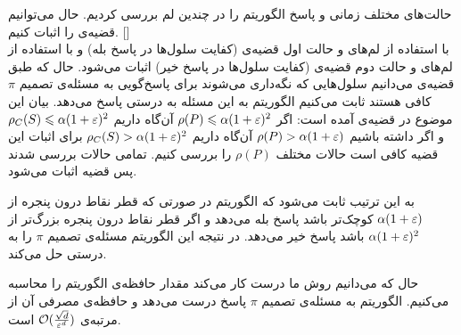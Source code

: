 حالت‌های مختلف زمانی و پاسخ الگوریتم را در چندین لم بررسی کردیم. حال می‌توانیم قضیه‌ی   را اثبات کنیم.
[]\\
با استفاده از لم‌های  و  حالت اول قضیه‌ی  (کفایت سلول‌ها در پاسخ بله) و با استفاده از لم‌های  و  حالت دوم قضیه‌ی  (کفایت سلول‌ها در پاسخ خیر) اثبات می‌شود. 
حال که طبق قضیه‌ی  می‌دانیم سلول‌هایی که نگه‌داری می‌شوند برای پاسخ‌گویی به مسئله‌ی تصمیم $\pi$ کافی هستند ثابت می‌کنیم الگوریتم  به این مسئله  به درستی پاسخ می‌دهد. بیان این موضوع در قضیه‌ی  آمده است:
اگر 
$ \rho(P) \leqslant \alpha (1 + \varepsilon) ^ 2 $
‌آن‌گاه داریم
$ \rho_C(S) \leqslant  \alpha (1 + \varepsilon) ^ 2 $
و اگر داشته باشیم
$ \rho(P) > \alpha (1 + \varepsilon) $
آن‌گاه داریم
$ \rho_C(S) > \alpha (1 + \varepsilon) ^ 2 $
برای اثبات این قضیه کافی است حالات مختلف $\rho(P)$ را بررسی کنیم.
تمامی حالات بررسی شدند پس قضیه اثبات می‌شود.

به این ترتیب ثابت می‌شود که الگوریتم  در صورتی که قطر نقاط درون پنجره از $\alpha ( 1+\varepsilon)$ کوچک‌تر باشد پاسخ بله می‌دهد و اگر قطر نقاط درون پنجره بزرگ‌تر از $\alpha (1+\varepsilon)^2$ باشد پاسخ خیر می‌دهد. در نتیجه این الگوریتم مسئله‌ی تصمیم $\pi$ را به درستی حل می‌کند.

حال که می‌دانیم روش ما درست کار می‌کند مقدار حافظه‌ی الگوریتم  را محاسبه می‌کنیم.
الگوریتم  به مسئله‌ی تصمیم $\pi$ پاسخ درست می‌دهد و حافظه‌ی مصرفی آن از مرتبه‌ی 
$\mathcal{O}(\frac{\sqrt{d}}{\varepsilon^d})$
است.
 
